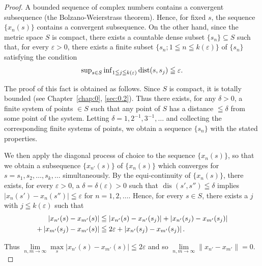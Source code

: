 \begin{proof}
 A bounded sequence of complex numbers contains a convergent subsequence (the Bolzano-Weierstrass theorem). Hence, for fixed $s$, the sequence $\{x_{n}(s)\}$ contains a convergent subsequence. On the other hand, since the metric space $S$ is compact, there exists a countable dense subset $\{s_{n}\} \subseteq S$ such that, for every $\varepsilon > 0$, there exists a finite subset $\{s_{n}; 1 \leqq n \leqq k(\varepsilon)\}$ of $\{s_{n}\}$ satisfying the condition 
\begin{equation}\label{eq:III.3.3}
\sup\nolimits _{s \in S} \inf\nolimits _{1 \leqq j \leqq k (\varepsilon)} \operatorname{dist} (s, s _{j}) \leqq \varepsilon . \end{equation}

The proof of this fact is obtained as follows. Since $S$ is compact, it is totally bounded (see Chapter~\ref{chap:0}, \ref{sec:0.2}). Thus there exists, for any $\delta > 0$, a finite system of points $\in S$ such that any point of $S$ has a distance $\leqq \delta$ from some point of the system. Letting $\delta = 1, 2^{-1}, 3^{-1}, \ldots$ and collecting the corresponding finite systems of points, we obtain a sequence $\{s_n\}$ with the stated properties. 

We then apply the diagonal process of choice to the sequence $\{x_{n}(s)\}$, so that we obtain a subsequence $\{x_{n'}(s)\}$ of $\{x_{n}(s)\}$ which converges for $s = s_1, s_2, \ldots, s_k, \ldots$ simultaneously. By the equi-continuity of $\{x_{n}(s)\}$, there exists, for every $\varepsilon > 0$, a $\delta = \delta(\varepsilon) > 0$ such that $\text{ dis }(s', s'') \leqq \delta$ implies $|x_{n}(s') - x_{n}(s'')| \leqq \varepsilon$ for $n = 1, 2, \ldots$. Hence, for every $s \in S$, there exists a $j$ with $j \leqq k(\varepsilon)$ such that 
\begin{align}
\left| x _ {n ^{\prime}} (s) - x _ {m ^{\prime}} (s) \right|& \leqq \left| x _ {n ^{\prime}} (s) - x _ {n ^{\prime}} (s _{j}) \right| + \left| x _ {n ^{\prime}} (s _{j}) - x _ {m ^{\prime}} (s _{j}) \right| \notag \\
+ \left| x _ {m ^{\prime}} (s _{j}) - x _ {m ^{\prime}} (s) \right|& \leqq 2 \varepsilon + \left| x _ {n ^{\prime}} (s _{j}) - x _ {m ^{\prime}} (s _{j}) \right|. \notag
\end{align}

Thus $\lim\limits_{n,m\to \infty}\max\limits_s|x_{n'}(s) - x_{m'}(s)|\leqq 2\varepsilon$ and so $\lim\limits_{n,m\to \infty}\|x_{n'} - x_{m'}\| = 0.$ 
\end{proof}


